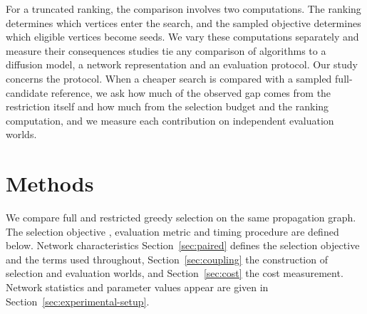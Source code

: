 \documentclass[smallextended]{svjour3}
\providecommand{\DIFaddtex}[1]{{\protect\color{blue} \sf #1}} %
\providecommand{\DIFdeltex}[1]{{\protect\color{red} \scriptsize #1}} %
\providecommand{\DIFaddbegin}{} %
\providecommand{\DIFaddend}{} %
\providecommand{\DIFdelbegin}{} %
\providecommand{\DIFdelend}{} %
\providecommand{\DIFadd}[1]{\texorpdfstring{\DIFaddtex{#1}}{#1}} %
\providecommand{\DIFdel}[1]{\texorpdfstring{\DIFdeltex{#1}}{}} %
\providecommand{\DIFscaledelfig}{0.5}
\newlength{\DIFdelgraphicswidth} %
\newlength{\DIFdelgraphicsheight} %
\providecommand{\DIFaddincludegraphics}[2][]{{\color{blue}\fbox{\DIFOincludegraphics[#1]{#2}}}} %
\providecommand{\DIFdelincludegraphics}[2][]{%
\sbox{\DIFdelgraphicsbox}{\DIFOincludegraphics[#1]{#2}}%
\settoboxwidth{\DIFdelgraphicswidth}{\DIFdelgraphicsbox} %
\settoboxtotalheight{\DIFdelgraphicsheight}{\DIFdelgraphicsbox} %
\scalebox{\DIFscaledelfig}{%
\parbox[b]{\DIFdelgraphicswidth}{\usebox{\DIFdelgraphicsbox}\\[-\baselineskip] \rule{\DIFdelgraphicswidth}{0em}}\llap{\resizebox{\DIFdelgraphicswidth}{\DIFdelgraphicsheight}{%
\setlength{\unitlength}{\DIFdelgraphicswidth}%
\begin{picture}(1,1)%
\thicklines\linethickness{2pt} %
{\color[rgb]{1,0,0}\put(0,0){\framebox(1,1){}}}%
{\color[rgb]{1,0,0}\put(0,0){\line( 1,1){1}}}%
{\color[rgb]{1,0,0}\put(0,1){\line(1,-1){1}}}%
\end{picture}%
}\hspace*{3pt}}} %
} %
\DeclareRobustCommand{\DIFaddbegin}{\DIFOaddbegin \let\includegraphics\DIFaddincludegraphics} %
\DeclareRobustCommand{\DIFaddend}{\DIFOaddend \let\includegraphics\DIFOincludegraphics} %
\DeclareRobustCommand{\DIFdelbegin}{\DIFOdelbegin \let\includegraphics\DIFdelincludegraphics} %
\DeclareRobustCommand{\DIFdelend}{\DIFOaddend \let\includegraphics\DIFOincludegraphics} %
\begin{document}
\DIFdel{For a truncated ranking, the comparison involves two computations. The ranking determines which vertices enter the search, and the sampled objective determines which eligible vertices become seeds. We vary these computations separately and measure their consequences }\DIFdelend \DIFaddbegin \DIFadd{studies tie any comparison of algorithms to a diffusion model, a network representation and an evaluation protocol. Our study concerns the protocol. When a cheaper search is compared with a sampled full-candidate reference, we ask how much of the observed gap comes from the restriction itself and how much from the selection budget and the ranking computation, and we measure each contribution }\DIFaddend on independent evaluation worlds.

\section{Methods}
We compare full and restricted greedy selection on the same propagation graph. \DIFdelbegin \DIFdel{The selection objective , evaluation metric and timing procedure are defined below. Network characteristics }\DIFdelend \DIFaddbegin \DIFadd{Section~\ref{sec:paired} defines the selection objective and the terms used throughout, Section~\ref{sec:coupling} the construction of selection and evaluation worlds, and Section~\ref{sec:cost} the cost measurement. Network statistics }\DIFaddend and parameter values \DIFdelbegin \DIFdel{appear }\DIFdelend \DIFaddbegin \DIFadd{are given }\DIFaddend in Section~\ref{sec:experimental-setup}.
\end{document}
